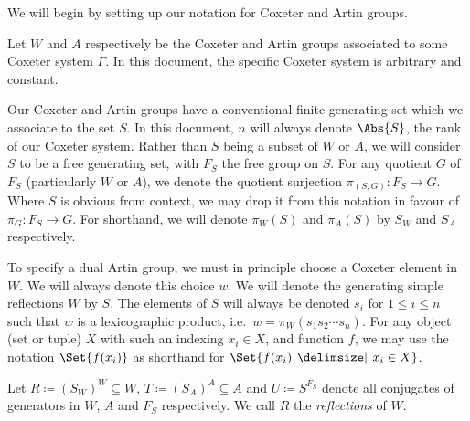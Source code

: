 We will begin by setting up our notation for Coxeter and Artin groups.

Let $W$ and  $A$ respectively be the Coxeter and Artin groups associated to some Coxeter system  $\Gamma$.
In this document, the specific Coxeter system is arbitrary and constant.

Our Coxeter and Artin groups have a conventional finite generating set which we associate to the set $S$.
In this document, $n$ will always denote $\Abs{S}$, the rank of our Coxeter system.
Rather than $S$ being a subset of  $W$ or  $A$, we will consider $S$ to be a free generating set, with $F_S$ the free group on $S$.
For any quotient $G$  of $F_S$ (particularly  $W$ or $A$), we denote the quotient surjection  $\pi_{(S,G)} \colon F_S \to G$.
Where $S$ is obvious from context, we may drop it from this notation in favour of  $\pi_G \colon F_S \to G$.
For shorthand, we will denote  $\pi_{W}(S)$ and  $\pi_{A}(S)$ by $S_W$ and  $S_A$ respectively.

To specify a dual Artin group, we must in principle choose a Coxeter element in $W$.
We will always denote this choice  $w$.
We will denote the generating simple reflections $W$ by $S$.
The elements of $S$ will always be denoted $s_i$ for  $1\leq i \leq n$ such that $w$ is a lexicographic product, i.e.~$w=\pi_{W}(s_1s_2\cdots s_n)$.
For any object (set or tuple) $X$ with such an indexing $x_i \in X$, and function $f$, we may use the notation $\Set{f(x_i)}$ as shorthand for $\Set{f(x_i) \given x_i \in X}$.

Let $R \coloneq (S_W)^{W} \subseteq W$, $T \coloneq (S_A)^{A} \subseteq A$ and $U \coloneq S^{F_S}$ denote all conjugates of generators in $W$, $A$ and $F_S$ respectively.
We call $R$ the \emph{reflections} of  $W$.

